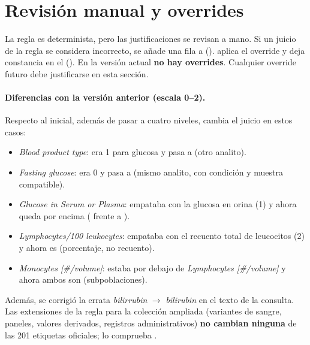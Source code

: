\documentclass[11pt,a4paper]{article}
\begin{document}
\begin{table}[h]
\centering
\footnotesize

\caption{Documentos del Excel con relevancia mayor que 0 en las consultas oficiales. El resto (61--63 por consulta) son .}
\end{table}

\begin{table}[h]
\centering
\footnotesize

\caption{Ejemplos de etiquetado de documentos de la colección, con las tres dimensiones del juicio. Incluye distractores difíciles
(\emph{Methylene chloride}, \emph{C reactive protein}) y registros administrativos (\emph{Platelets given}).}
\end{table}

\section{Revisión manual y overrides}

La regla es determinista, pero las justificaciones se revisan a mano. Si un juicio de la regla se considera
incorrecto, se añade una fila a  ().
 aplica el override y deja constancia en el 
(). En la versión actual \textbf{no hay overrides}. Cualquier override futuro
debe justificarse en esta sección.

\paragraph{Diferencias con la versión anterior (escala 0--2).} Respecto al  inicial,
además de pasar a cuatro niveles, cambia el juicio en estos casos:
\begin{itemize}
\item \emph{Blood product type}: era 1 para glucosa y pasa a  (otro analito).
\item \emph{Fasting glucose}: era 0 y pasa a  (mismo analito, con condición y muestra compatible).
\item \emph{Glucose in Serum or Plasma}: empataba con la glucosa en orina (1) y ahora queda por encima ( frente a ).
\item \emph{Lymphocytes/100 leukocytes}: empataba con el recuento total de leucocitos (2) y ahora es  (porcentaje, no recuento).
\item \emph{Monocytes [\#/volume]}: estaba por debajo de \emph{Lymphocytes [\#/volume]} y ahora ambos son  (subpoblaciones).
\end{itemize}
Además, se corrigió la errata \emph{bilirrubin} $\rightarrow$ \emph{bilirubin} en el texto de la consulta.
Las extensiones de la regla para la colección ampliada (variantes de sangre, paneles, valores derivados,
registros administrativos) \textbf{no cambian ninguna} de las 201 etiquetas oficiales; lo comprueba .
\end{document}
